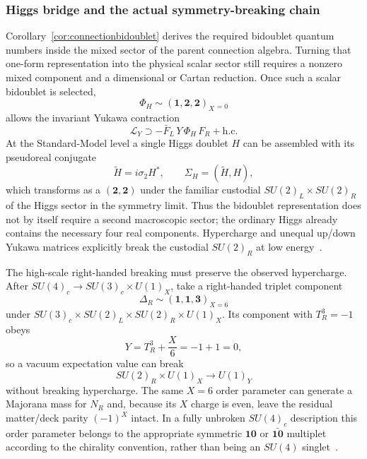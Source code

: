\documentclass[11pt]{article}
\theoremstyle{definition}\newtheorem{definition}[theorem]{Definition}
\theoremstyle{remark}\newtheorem{remark}[theorem]{Remark}\newtheorem{conjecture}[theorem]{Conjecture}
\begin{document}
\subsubsection{Higgs bridge and the actual symmetry-breaking chain}
Corollary~\ref{cor:connectionbidoublet} derives the required bidoublet quantum numbers inside the mixed sector of the parent connection algebra. Turning that one-form representation into the physical scalar sector still requires a nonzero mixed component and a dimensional or Cartan reduction. Once such a scalar bidoublet is selected,
\begin{equation}
 \Phi_H\sim(\mathbf1,\mathbf2,\mathbf2)_X{}_{=0}
\end{equation}
allows the invariant Yukawa contraction
\begin{equation}\label{eq:PSYukawa}
 \mathcal L_Y\supset
 -\bar F_L\,Y\,\Phi_H\,F_R+\mathrm{h.c.}
\end{equation}
At the Standard-Model level a single Higgs doublet $H$ can be assembled with its pseudoreal conjugate
\begin{equation}
 \widetilde H=i\sigma_2H^*,
 \qquad
 \Sigma_H=(\widetilde H,H),
\end{equation}
which transforms as a $(\mathbf2,\mathbf2)$ under the familiar custodial $SU(2)_L\times SU(2)_R$ of the Higgs sector in the symmetry limit. Thus the bidoublet representation does not by itself require a second macroscopic sector; the ordinary Higgs already contains the necessary four real components. Hypercharge and unequal up/down Yukawa matrices explicitly break the custodial $SU(2)_R$ at low energy~\cite{PDGHiggs2023}.

The high-scale right-handed breaking must preserve the observed hypercharge. After $SU(4)_c\to SU(3)_c\times U(1)_X$, take a right-handed triplet component
\begin{equation}
 \Delta_R\sim(\mathbf1,\mathbf1,\mathbf3)_{X=6}
\end{equation}
under $SU(3)_c\times SU(2)_L\times SU(2)_R\times U(1)_X$. Its component with $T^3_R=-1$ obeys
\begin{equation}
 Y=T^3_R+\frac X6=-1+1=0,
\end{equation}
so a vacuum expectation value can break
\begin{equation}\label{eq:PSbreakingchain}
 \boxed{
 SU(2)_R\times U(1)_X
 \longrightarrow U(1)_Y}
\end{equation}
without breaking hypercharge. The same $X=6$ order parameter can generate a Majorana mass for $N_R$ and, because its $X$ charge is even, leave the residual matter/deck parity $(-1)^X$ intact. In a fully unbroken $SU(4)_c$ description this order parameter belongs to the appropriate symmetric $\mathbf{10}$ or $\bar{\mathbf{10}}$ multiplet according to the chirality convention, rather than being an $SU(4)$ singlet~\cite{MohapatraPati1975,SenjanovicMohapatra1975}.
\end{document}
